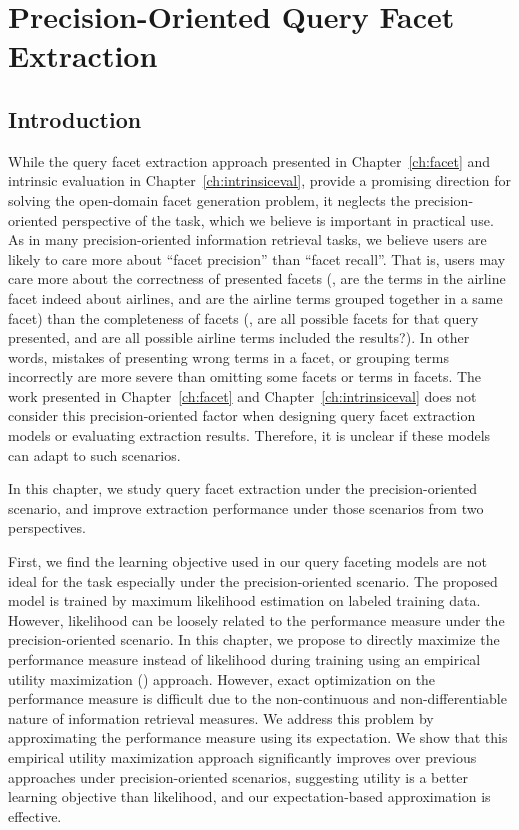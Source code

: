 \chapter{Precision-Oriented Query Facet Extraction}
\label{ch:precision}
\section{Introduction}
\label{sec:precision-intro}
While the query facet extraction approach presented in Chapter~\ref{ch:facet} and intrinsic evaluation in Chapter~\ref{ch:intrinsiceval}, provide a promising direction for solving the open-domain facet generation problem, it neglects the precision-oriented perspective of the task, which we believe is important in practical use. As in many precision-oriented information retrieval tasks, we believe users are likely to care more about ``facet precision'' than ``facet recall''. That is, users may care more about the correctness of presented facets (\eg, are the terms in the airline facet indeed about airlines, and are the airline terms grouped together in a same facet) than the completeness of facets (\eg, are all possible facets for that query presented, and are all possible airline terms included the results?). In other words, mistakes of presenting wrong terms in a facet, or grouping terms incorrectly are more severe than omitting some facets or terms in facets. The work presented in Chapter~\ref{ch:facet} 
and Chapter~\ref{ch:intrinsiceval} does not consider 
this precision-oriented factor when designing query facet extraction models or evaluating 
extraction results. Therefore, it is unclear if these models can adapt to such scenarios.

In this chapter, we study query facet extraction under the precision-oriented scenario, and improve extraction performance under those scenarios from two perspectives.

First, we find the learning objective used in our query faceting models are not ideal for the task especially under the precision-oriented scenario. The proposed model is trained by maximum likelihood estimation on labeled training data. However, likelihood can be loosely related to the performance measure under the precision-oriented scenario. In this chapter, we propose to directly maximize the performance measure \PRF instead of likelihood during training using an empirical utility maximization (\EUM) approach. However, exact optimization on the performance measure is difficult due to the non-continuous and non-differentiable nature of information retrieval measures. We address this problem by approximating the performance measure using its expectation. We show that this empirical utility maximization approach significantly improves over previous approaches under precision-oriented scenarios, suggesting utility is a better learning objective than likelihood, and our expectation-based 
approximation is effective.  


